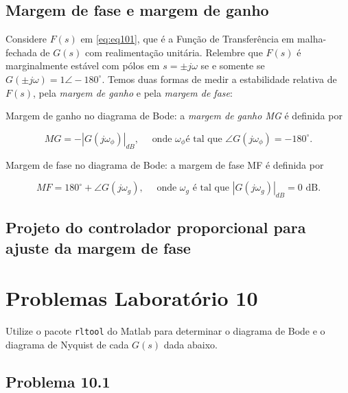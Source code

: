 \documentclass[
]{book}
\theoremstyle{definition}
\theoremstyle{definition}
\theoremstyle{definition}
\theoremstyle{remark}
\begin{document}
\hypertarget{margem-de-fase-e-margem-de-ganho}{%
\section{Margem de fase e margem de ganho}\label{margem-de-fase-e-margem-de-ganho}}

Considere \(F(s)\) em \eqref{eq:eq101}, que é a Função de Transferência em malha-fechada de \(G(s)\) com realimentação unitária. Relembre que \(F(s)\) é marginalmente estável com pólos em \(s = \pm j\omega\) se e somente se \(G(\pm j\omega) = 1 \angle−180^{\circ}\). Temos duas formas de medir a estabilidade relativa de \(F(s)\), pela \emph{margem de ganho} e pela \emph{margem de fase}:

Margem de ganho no diagrama de Bode: a \emph{margem de ganho MG} é definida por

\[
  \boxed{MG = -|G(j\omega_\phi)|_{dB}, \quad \text{ onde } \omega_\phi \text{é tal que } \angle{G(j\omega_\phi)}=-180^\circ}.
  \]

Margem de fase no diagrama de Bode: a margem de fase MF é definida por

\[
  \boxed{MF = 180^\circ + \angle{G(j\omega_g)}, \quad \text{ onde } \omega_g \text{ é tal que } |G(j\omega_g)|_{dB}=0\text{ dB}}.
  \]

\hypertarget{projeto-do-controlador-proporcional-para-ajuste-da-margem-de-fase}{%
\section{Projeto do controlador proporcional para ajuste da margem de fase}\label{projeto-do-controlador-proporcional-para-ajuste-da-margem-de-fase}}

\hypertarget{problemas-laboratuxf3rio-10}{%
\chapter*{Problemas Laboratório 10}\label{problemas-laboratuxf3rio-10}}

Utilize o pacote \texttt{rltool} do Matlab para determinar o diagrama de Bode e o diagrama de Nyquist de cada \(G(s)\) dada abaixo.

\hypertarget{problema-10.1}{%
\section*{Problema 10.1}\label{problema-10.1}}
\end{document}
